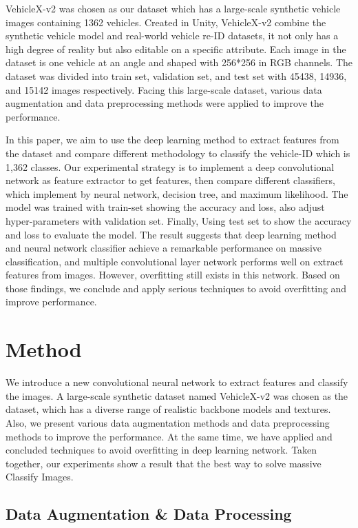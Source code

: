 \documentclass[runningheads]{llncs}
\begin{document}
VehicleX-v2 was chosen as our dataset which has a large-scale synthetic vehicle images containing 1362 vehicles. Created in Unity, VehicleX-v2 combine the synthetic vehicle model and real-world vehicle re-ID datasets, it not only has a high degree of reality but also editable on a specific attribute. Each image in the dataset is one vehicle at an angle and shaped with 256*256 in RGB channels. The dataset was divided into train set, validation set, and test set with 45438, 14936, and 15142 images respectively. Facing this large-scale dataset, various data augmentation and data preprocessing methods were applied to improve the performance.

In this paper, we aim to use the deep learning method to extract features from the dataset and compare different methodology to classify the vehicle-ID which is 1,362 classes. Our experimental strategy is to implement a deep convolutional network as feature extractor to get features, then compare different classifiers, which implement by neural network, decision tree, and maximum likelihood. The model was trained with train-set showing the accuracy and loss, also adjust hyper-parameters with validation set. Finally, Using test set to show the accuracy and loss to evaluate the model. The result suggests that deep learning method and neural network classifier achieve a remarkable performance on massive classification, and multiple convolutional layer network performs well on extract features from images. However, overfitting still exists in this network. Based on those findings, we conclude and apply serious techniques to avoid overfitting and improve performance.

\section{Method}
We introduce a new convolutional neural network to extract features and classify the images. A large-scale synthetic dataset named VehicleX-v2 was chosen as the dataset, which has a diverse range of realistic backbone models and textures. Also, we present various data augmentation methods and data preprocessing methods to improve the performance. At the same time, we have applied and concluded techniques to avoid overfitting in deep learning network. Taken together, our experiments show a result that the best way to solve massive Classify Images.

\subsection{Data Augmentation \& Data Processing}
\end{document}
